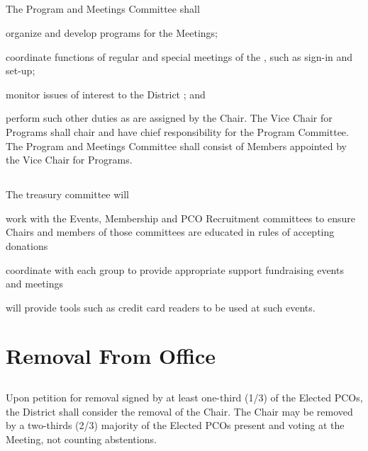 \subsection{} \label{meetings-committee}
The Program and Meetings Committee shall
\begin{inlinealphalist}
    \item organize and develop programs for the Meetings;
    \item coordinate functions of regular and special meetings of the , such as sign-in and set-up;
    \item monitor issues of interest to the \fortythird{} District ; and
    \item perform such other duties as are assigned by the Chair. The Vice Chair for Programs shall chair and have chief responsibility for the Program Committee. The Program and Meetings Committee shall consist of Members appointed by the Vice Chair for Programs.
\end{inlinealphalist}

\subsection{}
The treasury committee will
\begin{inlinealphalist}
    \item work with the Events, Membership and PCO Recruitment committees to ensure Chairs and members of those committees are educated in rules of accepting donations
    \item coordinate with each group to provide appropriate support fundraising events and meetings
    \item will provide tools such as credit card readers to be used at such events.
\end{inlinealphalist}

\section{Removal From Office}
\subsection{}
Upon petition for removal signed by at least one-third (1/3) of the Elected PCOs, the \fortythird{} District  shall consider the removal of the Chair. The Chair may be removed by a two-thirds (2/3) majority of the Elected PCOs present and voting at the Meeting, not counting abstentions.

